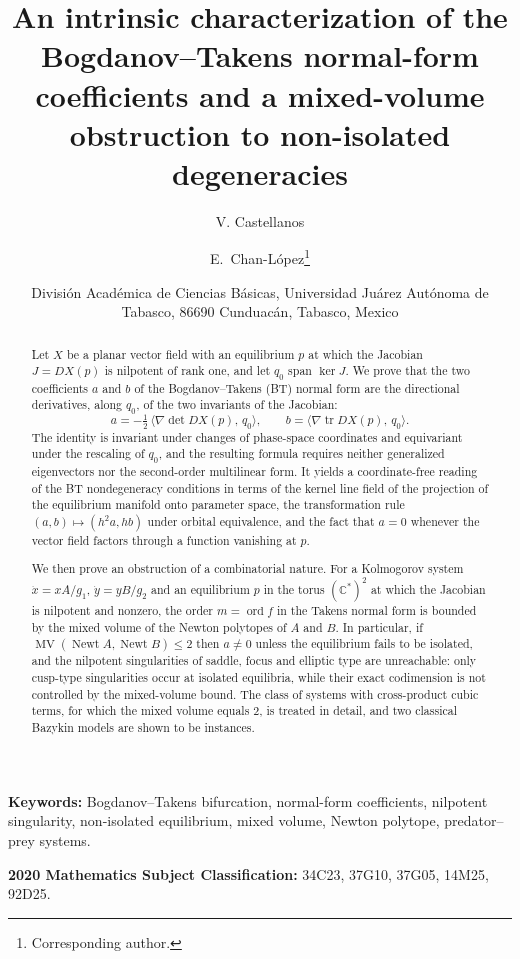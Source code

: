 \documentclass[12pt]{article}
\title{An intrinsic characterization of the Bogdanov--Takens
	normal-form coefficients and a mixed-volume obstruction to
	non-isolated degeneracies}
\author{
	V. Castellanos
	\and
	E.~Chan-L\'opez\thanks{Corresponding author.}
}
\date{%
	Divisi\'on Acad\'emica de Ciencias B\'asicas,
	Universidad Ju\'arez Aut\'onoma de Tabasco, 86690 Cunduac\'an,
	Tabasco, Mexico}
\theoremstyle{plain}
\theoremstyle{definition}
\theoremstyle{remark}
\newcommand{\C}{\mathbb{C}}
\newcommand{\tr}{\operatorname{tr}}
\DeclareMathOperator{\dt}{det}
\DeclareMathOperator{\MV}{MV}
\DeclareMathOperator{\Newt}{Newt}
\DeclareMathOperator{\ordop}{ord}
\newcommand{\ip}[2]{\langle #1,\, #2\rangle}
\begin{document}
	\maketitle
	
	\begin{abstract}
		Let $X$ be a planar vector field with an equilibrium $p$ at which the
		Jacobian $J=DX(p)$ is nilpotent of rank one, and let $q_{0}$ span
		$\ker J$.  We prove that the two coefficients $a$ and $b$ of the
		Bogdanov--Takens (BT) normal form are the directional derivatives,
		along $q_{0}$, of the two invariants of the Jacobian:
		\[
		a=-\tfrac12\,\ip{\nabla\!\dt DX(p)}{q_{0}},
		\qquad
		b=\ip{\nabla\!\tr DX(p)}{q_{0}} .
		\]
		The identity is invariant under changes of phase-space coordinates and
		equivariant under the rescaling of $q_{0}$, and the resulting formula
		requires neither generalized eigenvectors nor the second-order
		multilinear form.  It
		yields a coordinate-free reading of the BT nondegeneracy conditions in
		terms of the kernel line field of the projection of the equilibrium
		manifold onto parameter space, the transformation rule
		$(a,b)\mapsto(h^{2}a,hb)$ under orbital equivalence, and the fact that
		$a=0$ whenever the vector field factors through a function vanishing at
		$p$.
		
		We then prove an obstruction of a combinatorial nature.  For a
		Kolmogorov system $\dot x=xA/g_{1}$, $\dot y=yB/g_{2}$ and an
		equilibrium $p$ in the torus $(\C^{*})^{2}$ at which the Jacobian is
		nilpotent and nonzero, the order $m=\ordop f$ in the Takens normal form
		is bounded by the mixed volume of the Newton polytopes of $A$ and $B$.  In
		particular, if $\MV(\Newt A,\Newt B)\le2$ then $a\neq0$ unless the
		equilibrium fails to be isolated, and the nilpotent singularities of
		saddle, focus and elliptic type are unreachable: only cusp-type
		singularities occur at isolated equilibria, while their exact
		codimension is not controlled by the mixed-volume bound.  The class of systems with cross-product cubic
		terms, for which the mixed volume equals $2$, is treated in detail, and
		two classical Bazykin models are shown to be instances.
	\end{abstract}
	
	\noindent\textbf{Keywords:} Bogdanov--Takens bifurcation, normal-form
	coefficients, nilpotent singularity, non-isolated equilibrium, mixed
	volume, Newton polytope, predator--prey systems.
	
	\medskip
	\noindent\textbf{2020 Mathematics Subject Classification:}
	34C23, 37G10, 37G05, 14M25, 92D25.
	
\end{document}
